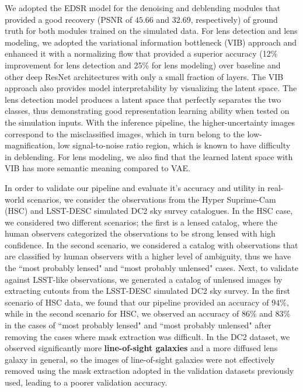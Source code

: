 \documentclass[12pt, twocolumn, apj]{openjournal}
\begin{document}
We adopted the EDSR model for the denoising and deblending modules that provided a good recovery (PSNR of $45.66$ and $32.69$, respectively) of ground truth for both modules trained on the simulated data. For lens detection and lens modeling, we adopted the variational information bottleneck (VIB) approach and enhanced it with a normalizing flow that provided a superior accuracy (12\% improvement for lens detection and 25\% for lens modeling) over baseline and other deep ResNet architectures with only a small fraction of layers. The VIB approach also provides model interpretability by visualizing the latent space. The lens detection model produces a latent space that perfectly separates the two classes, thus demonstrating good representation learning ability when tested on the simulation inputs. With the inference pipeline, the higher-uncertainty images correspond to the misclassified images, which in turn belong to the low-magnification, low signal-to-noise ratio region, which is known to have difficulty in deblending. For lens modeling, we also find that the learned latent space with VIB has more semantic meaning compared to VAE. 

In order to validate our pipeline and evaluate it's accuracy and utility in real-world scenarios, we consider the observations from the Hyper Suprime-Cam (HSC) and LSST-DESC simulated DC2 sky survey catalogues. In the HSC case, we considered two different scenarios; the first is a lensed catalog, where the human observers categorized the observations to be strong lensed with high confidence. In the second scenario, we considered a catalog with observations that are classified by human observers with a higher level of ambiguity, thus we have the ``most probably lensed" and ``most probably unlensed" cases. Next, to validate against LSST-like observations, we generated a catalog of unlensed images by extracting cutouts from the LSST-DESC simulated DC2 sky survey. In the first scenario of HSC data, we found that our pipeline provided an accuracy of $94\%$, while in the second scenario for HSC, we observed an accuracy of $86\%$ and $83\%$ in the cases of ``most probably lensed" and ``most probably unlensed" after removing the cases where mask extraction was difficult. In the DC2 dataset, we observed significantly more {\bf line-of-sight galaxies} and a more diffused lens galaxy in general, so the images of line-of-sight galaxies were not effectively removed using the mask extraction adopted in the validation datasets previously used, leading to a poorer validation accuracy.
\end{document}
